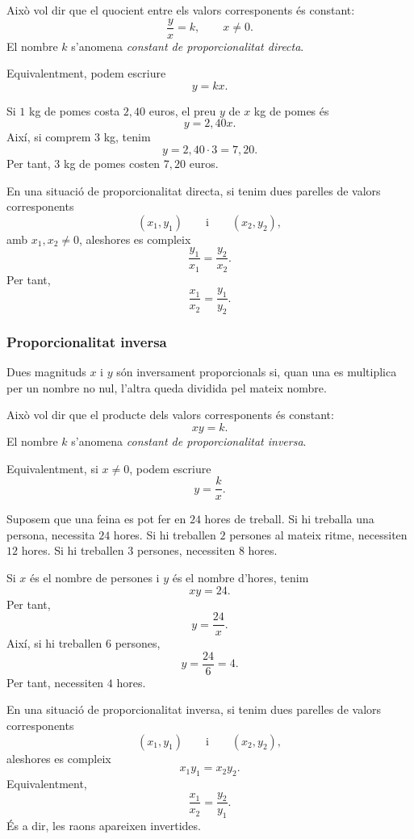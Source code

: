 Això vol dir que el quocient entre els valors corresponents és constant:
\[
	\frac{y}{x}=k,
	\qquad x\neq0.
\]
El nombre \(k\) s'anomena \emph{constant de proporcionalitat directa}.

Equivalentment, podem escriure
\[
	y=kx.
\]

\begin{exemple}
Si \(1\) kg de pomes costa \(2{,}40\) euros, el preu \(y\) de \(x\) kg de pomes és
\[
	y=2{,}40x.
\]
Així, si comprem \(3\) kg, tenim
\[
	y=2{,}40\cdot3=7{,}20.
\]
Per tant, \(3\) kg de pomes costen \(7{,}20\) euros.
\end{exemple}

En una situació de proporcionalitat directa, si tenim dues parelles de valors corresponents
\[
	(x_1,y_1)
	\qquad\text{i}\qquad
	(x_2,y_2),
\]
amb \(x_1,x_2\neq0\), aleshores es compleix
\[
	\frac{y_1}{x_1}
	=
	\frac{y_2}{x_2}.
\]
Per tant,
\[
	\frac{x_1}{x_2}
	=
	\frac{y_1}{y_2}.
\]

\subsubsection{Proporcionalitat inversa}

Dues magnituds \(x\) i \(y\) són inversament proporcionals si, quan una es multiplica per un nombre no nul, l'altra queda dividida pel mateix nombre.

Això vol dir que el producte dels valors corresponents és constant:
\[
	xy=k.
\]
El nombre \(k\) s'anomena \emph{constant de proporcionalitat inversa}.

Equivalentment, si \(x\neq0\), podem escriure
\[
	y=\frac{k}{x}.
\]

\begin{exemple}
Suposem que una feina es pot fer en \(24\) hores de treball. Si hi treballa una persona, necessita \(24\) hores. Si hi treballen \(2\) persones al mateix ritme, necessiten \(12\) hores. Si hi treballen \(3\) persones, necessiten \(8\) hores.

Si \(x\) és el nombre de persones i \(y\) és el nombre d'hores, tenim
\[
	xy=24.
\]
Per tant,
\[
	y=\frac{24}{x}.
\]
Així, si hi treballen \(6\) persones,
\[
	y=\frac{24}{6}=4.
\]
Per tant, necessiten \(4\) hores.
\end{exemple}

En una situació de proporcionalitat inversa, si tenim dues parelles de valors corresponents
\[
	(x_1,y_1)
	\qquad\text{i}\qquad
	(x_2,y_2),
\]
aleshores es compleix
\[
	x_1y_1=x_2y_2.
\]
Equivalentment,
\[
	\frac{x_1}{x_2}
	=
	\frac{y_2}{y_1}.
\]
És a dir, les raons apareixen invertides.


